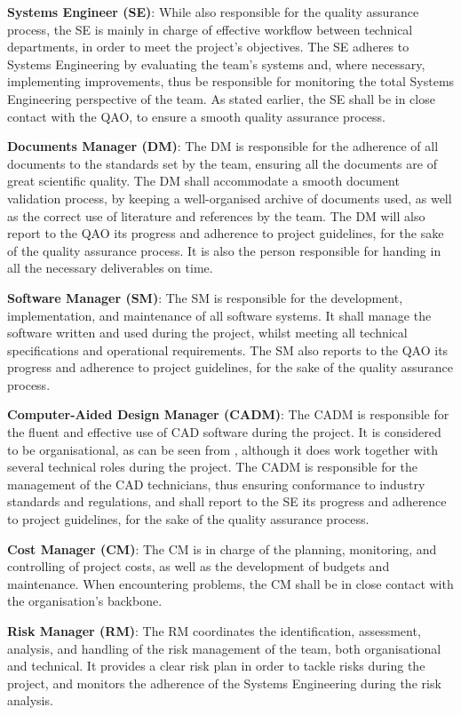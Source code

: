 \textbf{Systems Engineer (SE)}: While also responsible for the quality assurance process, the SE is mainly in charge of effective workflow between technical departments, in order to meet the project's objectives.
The SE adheres to Systems Engineering by evaluating the team's systems and, where necessary, implementing improvements, thus be responsible for monitoring the total Systems Engineering perspective of the team.
As stated earlier, the SE shall be in close contact with the QAO, to ensure a smooth quality assurance process.

\textbf{Documents Manager (DM)}: The DM is responsible for the adherence of all documents to the standards set by the team, ensuring all the documents are of great scientific quality.
The DM shall accommodate a smooth document validation process, by keeping a well-organised archive of documents used, as well as the correct use of literature and references by the team.
The DM will also report to the QAO its progress and adherence to project guidelines, for the sake of the quality assurance process.
It is also the person responsible for handing in all the necessary deliverables on time.

\textbf{Software Manager (SM)}: The SM is responsible for the development, implementation, and maintenance of all software systems.
It shall manage the software written and used during the project, whilst meeting all technical specifications and operational requirements.
The SM also reports to the QAO its progress and adherence to project guidelines, for the sake of the quality assurance process.

\textbf{Computer-Aided Design Manager (CADM)}: The CADM is responsible for the fluent and effective use of CAD software during the project.
It is considered to be organisational, as can be seen from , although it does work together with several technical roles during the project.
The CADM is responsible for the management of the CAD technicians, thus ensuring conformance to industry standards and regulations, and shall report to the SE its progress and adherence to project guidelines, for the sake of the quality assurance process.

\textbf{Cost Manager (CM)}: The CM is in charge of the planning, monitoring, and controlling of project costs, as well as the development of budgets and maintenance.
When encountering problems, the CM shall be in close contact with the organisation's backbone.

\textbf{Risk Manager (RM)}: The RM coordinates the identification, assessment, analysis, and handling of the risk management of the team, both organisational and technical.
It provides a clear risk plan in order to tackle risks during the project, and monitors the adherence of the Systems Engineering during the risk analysis.

